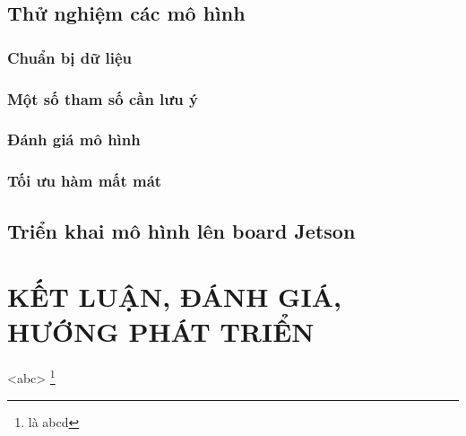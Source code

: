 \documentclass[a4paper]{report}
\begin{document}
\section{Thử nghiệm các mô hình}
\subsection{Chuẩn bị dữ liệu}
\subsection{Một số tham số cần lưu ý}
\subsection{Đánh giá mô hình}
\subsection{Tối ưu hàm mất mát}

\section{Triển khai mô hình lên board Jetson}

\chapter{KẾT LUẬN, ĐÁNH GIÁ, HƯỚNG PHÁT TRIỂN}
<abc>
\footnote{là abcd}

	


\end{document}
